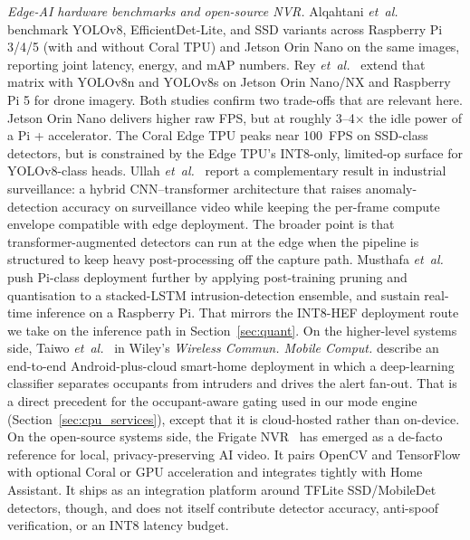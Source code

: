 \documentclass{ieeeaccess}
\begin{document}
\emph{Edge-AI hardware benchmarks and open-source NVR.} Alqahtani \emph{et~al.}~\cite{b25} benchmark YOLOv8, EfficientDet-Lite, and SSD variants across Raspberry Pi 3/4/5 (with and without Coral TPU) and Jetson Orin Nano on the same images, reporting joint latency, energy, and mAP numbers. Rey \emph{et~al.}~\cite{b26} extend that matrix with YOLOv8n and YOLOv8s on Jetson Orin Nano/NX and Raspberry Pi 5 for drone imagery. Both studies confirm two trade-offs that are relevant here. Jetson Orin Nano delivers higher raw FPS, but at roughly 3--4$\times$ the idle power of a Pi + accelerator. The Coral Edge TPU peaks near 100~FPS on SSD-class detectors, but is constrained by the Edge TPU's INT8-only, limited-op surface for YOLOv8-class heads. Ullah \emph{et~al.}~\cite{b27} report a complementary result in industrial surveillance: a hybrid CNN--transformer architecture that raises anomaly-detection accuracy on surveillance video while keeping the per-frame compute envelope compatible with edge deployment. The broader point is that transformer-augmented detectors can run at the edge when the pipeline is structured to keep heavy post-processing off the capture path. Musthafa \emph{et~al.}~\cite{b29} push Pi-class deployment further by applying post-training pruning and quantisation to a stacked-LSTM intrusion-detection ensemble, and sustain real-time inference on a Raspberry Pi. That mirrors the INT8-HEF deployment route we take on the inference path in Section~\ref{sec:quant}. On the higher-level systems side, Taiwo \emph{et~al.}~\cite{b31} in Wiley's \emph{Wireless Commun. Mobile Comput.} describe an end-to-end Android-plus-cloud smart-home deployment in which a deep-learning classifier separates occupants from intruders and drives the alert fan-out. That is a direct precedent for the occupant-aware gating used in our mode engine (Section~\ref{sec:cpu_services}), except that it is cloud-hosted rather than on-device. On the open-source systems side, the Frigate NVR~\cite{b24} has emerged as a de-facto reference for local, privacy-preserving AI video. It pairs OpenCV and TensorFlow with optional Coral or GPU acceleration and integrates tightly with Home Assistant. It ships as an integration platform around TFLite SSD/MobileDet detectors, though, and does not itself contribute detector accuracy, anti-spoof verification, or an INT8 latency budget.
\end{document}
